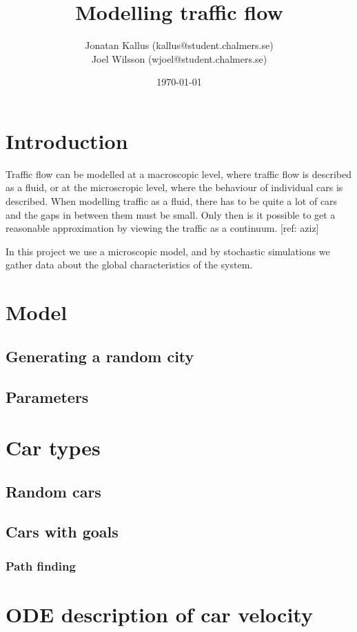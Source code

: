 \documentclass[11pt,a4paper]{report}
\author{Jonatan Kallus (kallus@student.chalmers.se)\\
Joel Wilsson (wjoel@student.chalmers.se)}
\date{\today}
\title{Modelling traffic flow}
\begin{document}
\maketitle

\section{Introduction}
Traffic flow can be modelled at a macroscopic level, where traffic flow is
described as a fluid, or at the microscropic level, where the behaviour of
individual cars is described. When modelling traffic as a fluid, there has
to be quite a lot of cars and the gaps in between them must be small. Only
then is it possible to get a reasonable approximation by viewing the traffic
as a continuum. [ref: aziz]

In this project we use a microscopic model, and by stochastic simulations
we gather data about the global characteristics of the system.

\section{Model}
\subsection{Generating a random city}
\subsection{Parameters}

\section{Car types}
\subsection{Random cars}
\subsection{Cars with goals}
\subsubsection{Path finding}

\section{ODE description of car velocity}
\end{document}
